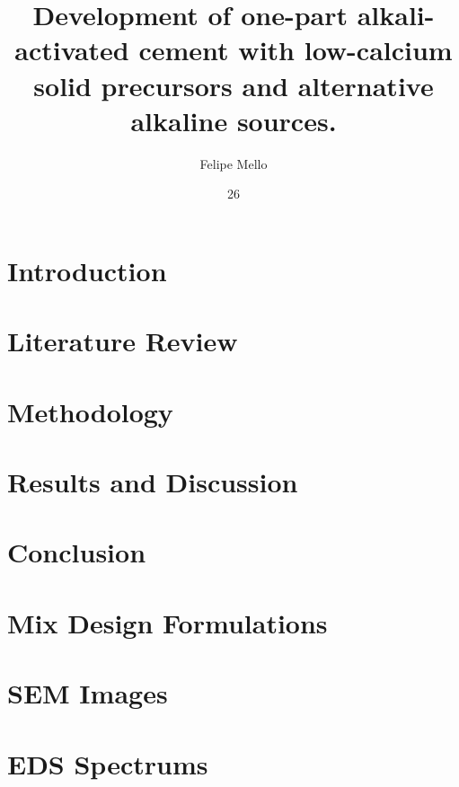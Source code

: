 \documentclass[tg, eng, dv]{ita}    %
\author{Felipe Mello}{dos Reis}
\title{Development of one-part alkali-activated cement with low-calcium solid precursors and alternative alkaline sources.}
\date{26}{maio}{2025}
\begin{document}


\mainmatter

\chapter{Introduction}


\chapter{Literature Review}


\chapter{Methodology}


\chapter{Results and Discussion}


\chapter{Conclusion}


\renewcommand\bibname{\itareferencesnamebabel} %


\appendix
\chapter{Mix Design Formulations} %


\chapter{SEM Images} %


\chapter{EDS Spectrums}


% 
\end{document}
